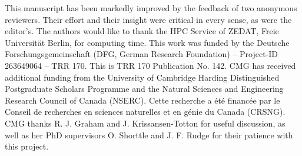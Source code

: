 \documentclass[3p,authoryear]{elsarticle}
\begin{document}
This manuscript has been markedly improved by the feedback of two anonymous reviewers. Their effort and their insight were critical in every sense, as were the editor's. The authors would like to thank the HPC Service of ZEDAT, Freie Universit\"{a}t Berlin, for computing time. This work was funded by the Deutsche Forschungsgemeinschaft (DFG, German Research Foundation) -- Project-ID 263649064 -- TRR 170. This is TRR 170 Publication No. 142. CMG has received additional funding from the University of Cambridge Harding Distinguished Postgraduate Scholars Programme and the Natural Sciences and Engineering Research Council of Canada (NSERC). Cette recherche a \'{e}t\'{e} financ\'{e}e par le Conseil de recherches en sciences naturelles et en g\'{e}nie du Canada (CRSNG). CMG thanks R. J. Graham and J. Krissansen-Totton for useful discussion, as well as her PhD supervisors O. Shorttle and J. F. Rudge for their patience with this project. 




\end{document}
